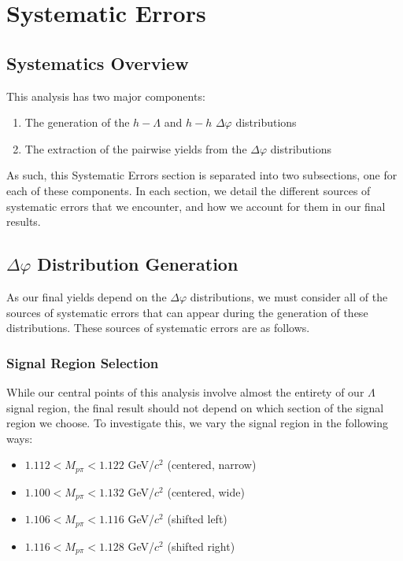 \documentclass[ALICE,manyauthors]{ALICE_analysis_notes}
\begin{document}
\section{Systematic Errors}
\label{systematics}
\subsection{Systematics Overview}
This analysis has two major components:
\begin{enumerate}
\item The generation of the $h-\Lambda$ and $h-h$ $\Delta\varphi$ distributions
\item The extraction of the pairwise yields from the $\Delta\varphi$ distributions
\end{enumerate}

As such, this Systematic Errors section is separated into two subsections, one for each of these components. In each section, we detail the different sources of systematic errors that we encounter, and how we account for them in our final results.


\subsection{$\Delta\varphi$ Distribution Generation}
As our final yields depend on the $\Delta\varphi$ distributions, we must consider all of the sources of systematic errors that can appear during the generation of these distributions. These sources of systematic errors are as follows.

\subsubsection{Signal Region Selection}
While our central points of this analysis involve almost the entirety of our $\Lambda$ signal region, the final result should not depend on which section of the signal region we choose. To investigate this, we vary the signal region in the following ways:

\begin{itemize}
\item $1.112 < M_{p\pi} < 1.122$ GeV/$c^2$ (centered, narrow)
\item $1.100 < M_{p\pi} < 1.132$ GeV/$c^2$ (centered, wide)
\item $1.106 < M_{p\pi} < 1.116$ GeV/$c^2$ (shifted left)
\item $1.116 < M_{p\pi} < 1.128$ GeV/$c^2$ (shifted right)
\end{itemize}
\end{document}
